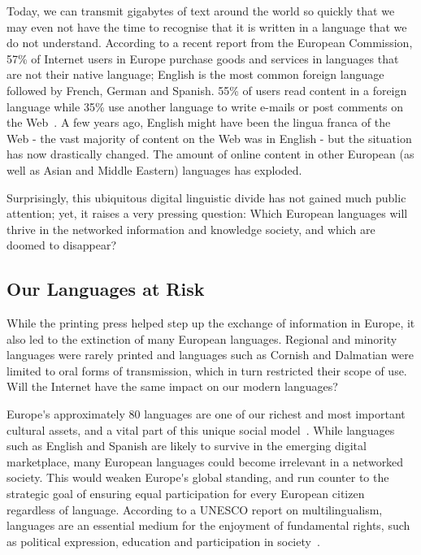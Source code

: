 \begin{multicols}{2}

Today, we can transmit gigabytes of text around the world so quickly that we may even not have the time to recognise that it is written in a language that we do not understand. According to a recent report from the European Commission, 57\% of Internet users in Europe purchase goods and services in languages that are not their native language; English is the most common foreign language followed by French, German and Spanish. 55\% of users read content in a foreign language while 35\% use another language to write e-mails or post comments on the Web~\cite{Eurobarometer313}. A few years ago, English might have been the lingua franca of the Web - the vast majority of content on the Web was in English  - but the situation has now drastically changed. The amount of online content in other European (as well as Asian and Middle Eastern) languages has exploded.


Surprisingly, this ubiquitous digital linguistic divide has not gained much public attention; yet, it raises a very pressing question: Which European languages will thrive in the networked information and knowledge society, and which are doomed to disappear?

\subsection{Our Languages at Risk}

While the printing press helped step up the exchange of information in Europe, it also led to the extinction of many European languages. Regional and minority languages were rarely printed and languages such as Cornish and Dalmatian were limited to oral forms of transmission, which in turn restricted their scope of use. Will the Internet have the same impact on our modern languages?


Europe{\mbox '}s approximately 80 languages are one of our richest and most important cultural assets, and a vital part of this unique social model~\cite{EC2}. While languages such as English and Spanish are likely to survive in the emerging digital marketplace, many European languages could become irrelevant in a networked society. This would weaken Europe{\mbox '}s global standing, and run counter to the strategic goal of ensuring equal participation for every European citizen regardless of language. According to a UNESCO report on multilingualism, languages are an essential medium for the enjoyment of fundamental rights, such as political expression, education and participation in society~\cite{UNESCO2007}.


\end{multicols}
